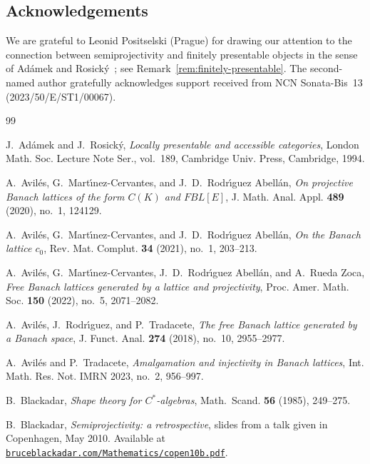\documentclass[11pt]{amsart}
\numberwithin{equation}{section}
\theoremstyle{definition}
\theoremstyle{remark}
\theoremstyle{plain}
\begin{document}
\subsection*{Acknowledgements}
We are grateful to Leonid Positselski (Prague) for drawing our attention to the
connection between semiprojectivity and finitely presentable objects
in the sense of Ad\'amek and Rosick\'y~\cite{adamek-rosicky};
see Remark~\ref{rem:finitely-presentable}.
The second-named author gratefully acknowledges support received from
NCN Sonata-Bis~13 (2023/50/E/ST1/00067).

\begin{thebibliography}{99}

J.~Ad\'amek and J.~Rosick\'y,
\emph{Locally presentable and accessible categories},
London Math. Soc. Lecture Note Ser., vol.~189,
Cambridge Univ. Press, Cambridge, 1994.

A.~Avil\'es, G.~Mart\'{\i}nez-Cervantes, and J.~D.~Rodr\'{\i}guez Abell\'an,
\emph{On projective {B}anach lattices of the form {$C(K)$} and {$FBL[E]$}},
J. Math. Anal. Appl. \textbf{489} (2020), no.~1, 124129.

A.~Avil\'es, G.~Mart\'{\i}nez-Cervantes, and J.~D.~Rodr\'{\i}guez Abell\'an,
\emph{On the {B}anach lattice {$c_0$}},
Rev. Mat. Complut. \textbf{34} (2021), no.~1, 203--213.


A.~Avil\'es, G.~Mart\'{\i}nez-Cervantes, J.~D.~Rodr\'{\i}guez Abell\'an, and A.~Rueda Zoca,
\emph{Free Banach lattices generated by a lattice and projectivity},
Proc. Amer. Math. Soc. \textbf{150} (2022), no.~5, 2071--2082.

A.~Avil\'es, J.~Rodr\'{\i}guez, and P.~Tradacete,
\emph{The free {B}anach lattice generated by a {B}anach space},
J. Funct. Anal. \textbf{274} (2018), no.~10, 2955--2977.

A.~Avil\'es and P.~Tradacete,
\emph{Amalgamation and injectivity in Banach lattices},
Int. Math. Res. Not. IMRN 2023, no.~2, 956--997.


B.~Blackadar,
\emph{Shape theory for $C^*$-algebras},
Math.\ Scand. \textbf{56} (1985), 249--275.

B.~Blackadar,
\emph{Semiprojectivity: a retrospective},
slides from a talk given in Copenhagen, May 2010.
Available at \href{http://bruceblackadar.com/Mathematics/copen10b.pdf}{\texttt{bruceblackadar.com/Mathematics/copen10b.pdf}}.


\end{thebibliography}
\end{document}
